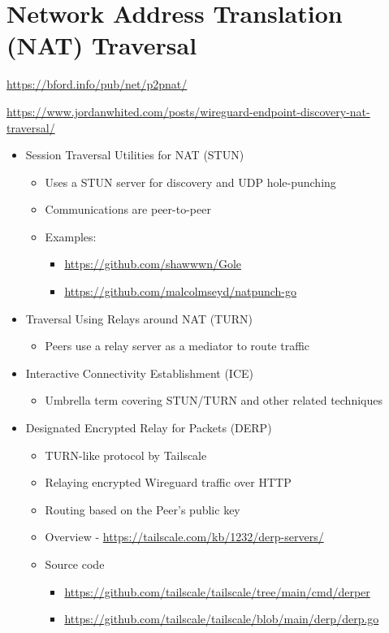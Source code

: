 \hypertarget{network-address-translation-nat-traversal}{%
\section{Network Address Translation (NAT)
Traversal}\label{network-address-translation-nat-traversal}}

\url{https://bford.info/pub/net/p2pnat/}

\url{https://www.jordanwhited.com/posts/wireguard-endpoint-discovery-nat-traversal/}

\begin{itemize}
\tightlist
\item
  Session Traversal Utilities for NAT (STUN)

  \begin{itemize}
  \tightlist
  \item
    Uses a STUN server for discovery and UDP hole-punching
  \item
    Communications are peer-to-peer
  \item
    Examples:

    \begin{itemize}
    \tightlist
    \item
      \url{https://github.com/shawwwn/Gole}
    \item
      \url{https://github.com/malcolmseyd/natpunch-go}
    \end{itemize}
  \end{itemize}
\item
  Traversal Using Relays around NAT (TURN)

  \begin{itemize}
  \tightlist
  \item
    Peers use a relay server as a mediator to route traffic
  \end{itemize}
\item
  Interactive Connectivity Establishment (ICE)

  \begin{itemize}
  \tightlist
  \item
    Umbrella term covering STUN/TURN and other related techniques
  \end{itemize}
\item
  Designated Encrypted Relay for Packets (DERP)

  \begin{itemize}
  \tightlist
  \item
    TURN-like protocol by Tailscale
  \item
    Relaying encrypted Wireguard traffic over HTTP
  \item
    Routing based on the Peer's public key
  \item
    Overview - \url{https://tailscale.com/kb/1232/derp-servers/}
  \item
    Source code

    \begin{itemize}
    \tightlist
    \item
      \url{https://github.com/tailscale/tailscale/tree/main/cmd/derper}
    \item
      \url{https://github.com/tailscale/tailscale/blob/main/derp/derp.go}
    \end{itemize}
  \end{itemize}
\end{itemize}
